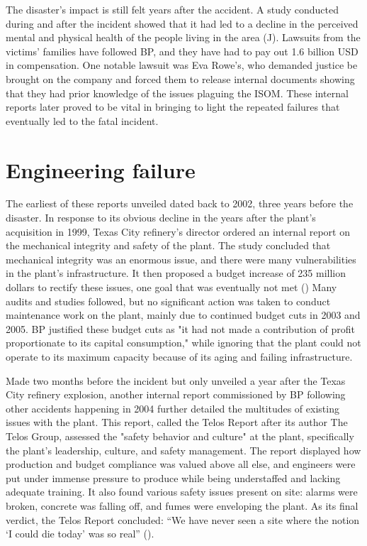 \documentclass[12pt]{article}
\begin{document}
	The disaster's impact is still felt years after the accident. A study conducted during and after the incident showed that it had led to a decline in the perceived mental and physical health of the people living in the area (\cite{Peek106}J). Lawsuits from the victims' families have followed BP, and they have had to pay out 1.6 billion USD in compensation. One notable lawsuit was Eva Rowe's, who demanded justice be brought on the company and forced them to release internal documents showing that they had prior knowledge of the issues plaguing the ISOM. These internal reports later proved to be vital in bringing to light the repeated failures that eventually led to the fatal incident.
	
	\section*{Engineering failure}
	The earliest of these reports unveiled dated back to 2002, three years before the disaster. In response to its obvious decline in the years after the plant's acquisition in 1999, Texas City refinery's director ordered an internal report on the mechanical integrity and safety of the plant. The study concluded that mechanical integrity was an enormous issue, and there were many vulnerabilities in the plant's infrastructure. It then proposed a budget increase of 235 million dollars to rectify these issues, one goal that was eventually not met (\cite{csbreport}) Many audits and studies followed, but no significant action was taken to conduct maintenance work on the plant, mainly due to continued budget cuts in 2003 and 2005. BP justified these budget cuts as "it had not made a contribution of profit proportionate to its capital consumption," while ignoring that the plant could not operate to its maximum capacity because of its aging and failing infrastructure.
	
	Made two months before the incident but only unveiled a year after the Texas City refinery explosion, another internal report commissioned by BP following other accidents happening in 2004 further detailed the multitudes of existing issues with the plant. This report, called the Telos Report after its author The Telos Group, assessed the "safety behavior and culture" at the plant, specifically the plant's leadership, culture, and safety management. The report displayed how production and budget compliance was valued above all else, and engineers were put under immense pressure to produce while being understaffed and lacking adequate training. It also found various safety issues present on site: alarms were broken, concrete was falling off, and fumes were enveloping the plant. As its final verdict, the Telos Report concluded: “We have never seen a site where the notion ‘I could die today’ was so real” (\cite{telosreport}).
	
\end{document}
